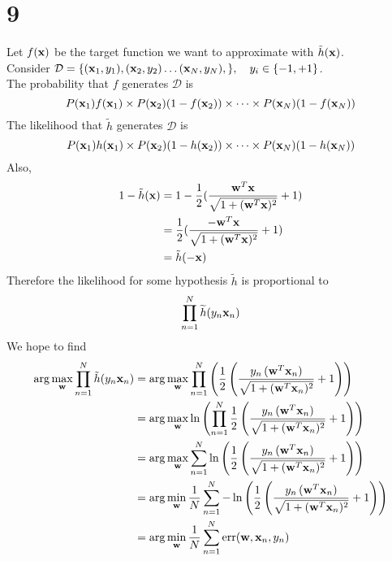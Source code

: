 \documentclass[11pt]{article}
\theoremstyle{definition}
\begin{document}
\section*{9}
Let $f(\vb{x})$ be the target function we want to approximate with $\tilde{h}(\vb{x})$. \\
Consider $\mathcal{D} = \{(\vb{x}_1, y_1),(\vb{x}_2, y_2)\dots(\vb{x}_N, y_N),\}, \quad y_i\in\{-1, +1\}$. \\ 
The probability that $f$ generates $\mathcal{D}$ is
\[
  P(\vb{x}_1)f(\vb{x}_1)\times P(\vb{x}_2)(1 - f(\vb{x}_2))\times\dots\times P(\vb{x}_N)(1 - f(\vb{x}_N))
\]
The likelihood that $\tilde{h}$ generates $\mathcal{D}$ is 
\[
  P(\vb{x}_1)h(\vb{x}_1)\times P(\vb{x}_2)(1 - h(\vb{x}_2))\times\dots\times P(\vb{x}_N)(1 - h(\vb{x}_N))
\]
Also, 
\begin{align*}
  1 - \tilde{h}(\vb{x}) &= 1 - \frac{1}{2}(\frac{\vb{w}^T\vb{x}}{\sqrt{1 + (\vb{w}^T\vb{x})^2}} + 1) \\ 
  &= \frac{1}{2}(\frac{-\vb{w}^T\vb{x}}{\sqrt{1 + (\vb{w}^T\vb{x})^2}} + 1) \\ 
  &= \tilde{h}(-\vb{x})
\end{align*}
Therefore the likelihood for some hypothesis $\tilde{h}$ is proportional to
\[
  \prod^N_{n = 1}\widetilde{h}(y_n\vb{x}_n)
\]
We hope to find
\begin{align*}
  \arg\max_{\vb{w}} \prod_{n=1}^{N} \tilde{h}(y_n\vb{x}_n) &= \arg\max_{\vb{w}} \prod_{n=1}^{N} \left(\frac{1}{2}\left(\frac{y_n \, (\vb{w}^T \vb{x}_n)}{\sqrt{1 + (\vb{w}^T \vb{x}_n)^2}} + 1\right)\right) \\ 
  &= \arg\max_{\vb{w}} \ln \left( \prod_{n=1}^{N} \frac{1}{2}\left( \frac{y_n \, (\vb{w}^T \vb{x}_n)}{\sqrt{1 + (\vb{w}^T \vb{x}_n)^2}} + 1\right) \right) \\ 
  &= \arg\max_{\vb{w}} \sum_{n=1}^{N} \ln \left(\frac{1}{2}\left( \frac{y_n \, (\vb{w}^T \vb{x}_n)}{\sqrt{1 + (\vb{w}^T \vb{x}_n)^2}} + 1\right) \right)  \\
  &= \arg\min_{\vb{w}} \frac{1}{N}\sum_{n=1}^{N} -\ln \left(\frac{1}{2}\left( \frac{y_n \, (\vb{w}^T \vb{x}_n)}{\sqrt{1 + (\vb{w}^T \vb{x}_n)^2}} + 1\right) \right) \\
  &= \arg\min_{\vb{w}}\frac{1}{N}\sum_{n=1}^{N}\text{err}(\vb{w},\vb{x}_n,y_n)
\end{align*}
\end{document}
